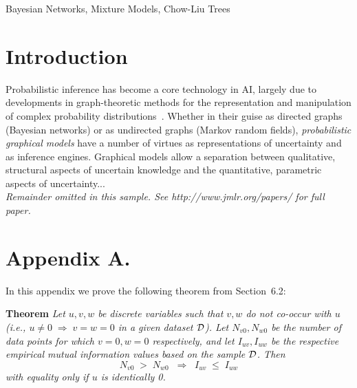 	\begin{keywords}
		Bayesian Networks, Mixture Models, Chow-Liu Trees
	\end{keywords}
	
	\section{Introduction}
	
	Probabilistic inference has become a core technology in AI,
	largely due to developments in graph-theoretic methods for the 
	representation and manipulation of complex probability 
	distributions~\citep{pearl:88}.  Whether in their guise as 
	directed graphs (Bayesian networks) or as undirected graphs (Markov 
	random fields), \emph{probabilistic graphical models} have a number 
	of virtues as representations of uncertainty and as inference engines.  
	Graphical models allow a separation between qualitative, structural
	aspects of uncertain knowledge and the quantitative, parametric aspects 
	of uncertainty...\\
	
	{\noindent \em Remainder omitted in this sample. See http://www.jmlr.org/papers/ for full paper.}
	
	
	
	
	\newpage
	
	\appendix
	\section*{Appendix A.}
	\label{app:theorem}
	
	
	
	In this appendix we prove the following theorem from
	Section~6.2:
	
	\noindent
	{\bf Theorem} {\it Let $u,v,w$ be discrete variables such that $v, w$ do
		not co-occur with $u$ (i.e., $u\neq0\;\Rightarrow \;v=w=0$ in a given
		dataset ${\cal D}$). Let $N_{v0},N_{w0}$ be the number of data points for
		which $v=0, w=0$ respectively, and let $I_{uv},I_{uw}$ be the
		respective empirical mutual information values based on the sample
		${\cal D}$. Then
		\[
		N_{v0} \;>\; N_{w0}\;\;\Rightarrow\;\;I_{uv} \;\leq\;I_{uw}
		\]
		with equality only if $u$ is identically 0.} \hfill\BlackBox
	
